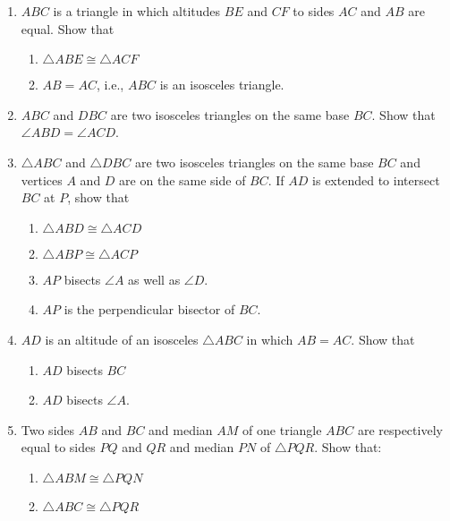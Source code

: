 \begin{enumerate}[label=\thesection.\arabic*.,ref=\thesection.\theenumi]
\item $ABC$ is a triangle in which altitudes $BE$ and $CF$ to sides $AC$ and $AB$ are equal. Show that
%
\begin{enumerate} 
\item $\triangle  ABE \cong  \triangle  ACF $
\item  $AB = AC$, i.e., $ABC$ is an isosceles triangle.
\end{enumerate}
%
\item $ABC$ and $DBC$ are two isosceles triangles on the same base $BC$. Show that $\angle ABD = \angle ACD$.
%
\item  $\triangle  ABC$ and $\triangle  DBC$ are two isosceles triangles on the same base $BC$ and vertices $A$ and $D$ are on the same side of $BC$. If $AD$ is extended to intersect $BC$ at $P$, show that
\begin{enumerate}
\item $\triangle  ABD \cong  \triangle  ACD $
\item $\triangle  ABP \cong  \triangle  ACP $
\item $AP$ bisects $\angle  A$ as well as $\angle  D$. 
\item $AP$ is the perpendicular bisector of $BC$.
\end{enumerate}
\item $AD$ is an altitude of an isosceles $\triangle ABC$ in which $AB = AC$. Show that 
\begin{enumerate}
\item $AD$ bisects $BC$
\item $AD$ bisects $\angle  A$. 
\end{enumerate}

\item  Two sides $AB$ and $BC$ and median $AM$ of one triangle $ABC$ are respectively equal to sides $PQ$ and $QR$ and median $PN$ of $\triangle  PQR$. Show that: 
\begin{enumerate}
\item $\triangle  ABM \cong  \triangle  PQN $
\item $\triangle  ABC \cong  \triangle  PQR$
\end{enumerate}
%


\end{enumerate}
